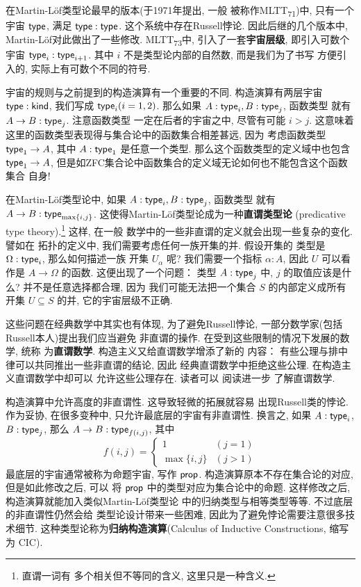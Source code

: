 在Martin-L\"of类型论最早的版本(于1971年提出, 一般
被称作MLTT\textsubscript{71})中, 只有一个宇宙
\(\textsf{type}\), 满足 \(\textsf{type} : \textsf{type}\).
这个系统中存在Russell悖论. 因此后继的几个版本中,
Martin-L\"of对此做出了一些修改. MLTT\textsubscript{73}中,
引入了一套\textbf{宇宙层级}, 即引入可数个宇宙
\(\textsf{type}_i : \textsf{type}_{i+1}\).
其中 \(i\) 不是类型论内部的自然数, 而是我们为了书写
方便引入的, 实际上有可数个不同的符号.

宇宙的规则与之前提到的构造演算有一个重要的不同.
构造演算有两层宇宙 \(\textsf{type} : \textsf{kind}\),
我们写成 \(\textsf{type}_i (i = 1,2)\). 那么如果
\(A : \textsf{type}_i, B : \textsf{type}_j\), 函数类型
就有 \(A \to B : \textsf{type}_j\). 注意函数类型
一定在后者的宇宙之中, 尽管有可能 \(i > j\). 这意味着
这里的函数类型表现得与集合论中的函数集合相差甚远, 因为
考虑函数类型 \(\textsf{type}_1 \to A\), 其中 \(A : \textsf{type}_1\)
是任意一个类型. 那么这个函数类型的定义域中也包含 \(\textsf{type}_1 \to A\),
但是如ZFC集合论中函数集合的定义域无论如何也不能包含这个函数集合
自身!

在Martin-L\"of类型论中, 如果
\(A : \textsf{type}_i, B : \textsf{type}_j\), 函数类型
就有 \(A \to B : \textsf{type}_{\max\{i,j\}}\).
这使得Martin-L\"of类型论成为一种\textbf{直谓类型论}
(predicative type theory).\footnote{直谓一词有
多个相关但不等同的含义, 这里只是一种含义.} 这样, 在一般
数学中的一些非直谓的定义就会出现一些复杂的变化. 譬如在
拓扑的定义中, 我们需要考虑任何一族开集的并. 假设开集的
类型是 \(\Omega : \textsf{type}_i\), 那么如何描述一族
开集 \(U_\alpha\) 呢? 我们需要一个指标 \(\alpha : A\),
因此 \(U\) 可以看作是 \(A \to \Omega\) 的函数.
这便出现了一个问题： 类型 \(A : \textsf{type}_j\) 中,
\(j\) 的取值应该是什么? 并不是任意选择都合理, 因为
我们可能无法把一个集合 \(S\) 的内部定义成所有开集 \(U \subseteq S\)
的并, 它的宇宙层级不正确.

这些问题在经典数学中其实也有体现, 为了避免Russell悖论,
一部分数学家(包括Russell本人)提出我们应当避免
非直谓的操作. 在受到这些限制的情况下发展的数学, 统称
为\textbf{直谓数学}. 构造主义又给直谓数学增添了新的
内容： 有些公理与排中律可以共同推出一些非直谓的结论, 因此
经典直谓数学中拒绝这些公理. 在构造主义直谓数学中却可以
允许这些公理存在. 读者可以
阅读\cite{feferman:2000:predicative}进一步
了解直谓数学.

构造演算中允许高度的非直谓性. 这导致轻微的拓展就容易
出现Russell类的悖论. 作为妥协, 在很多变种中,
只允许最底层的宇宙有非直谓性. 换言之, 如果 \(A : \textsf{type}_i\),
\(B : \textsf{type}_j\), 那么
\(A \to B : \textsf{type}_{f(i,j)}\), 其中
\[f(i,j) = \begin{cases}
1 & (j = 1)\\
\max\{i,j\} & (j > 1)
\end{cases}\]
最底层的宇宙通常被称为命题宇宙, 写作 \(\textsf{prop}\).
构造演算原本不存在集合论的对应, 但是如此修改之后, 可以
将 \(\textsf{prop}\) 中的类型对应为集合论中的命题.
这样修改之后, 构造演算就能加入类似Martin-L\"of类型论
中的归纳类型与相等类型等等. 不过底层的非直谓性仍然会给
类型论设计带来一些困难, 因此为了避免悖论需要注意很多技术细节.
这种类型论称为\textbf{归纳构造演算}(Calculus of Inductive
Constructions, 缩写为 CIC).

